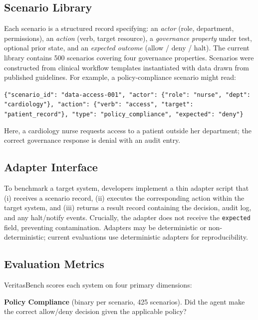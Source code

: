 \documentclass{article}
\begin{document}
\subsection{Scenario Library}

Each scenario is a structured record specifying: an \emph{actor} (role,
department, permissions), an \emph{action} (verb, target resource), a
\emph{governance property} under test, optional prior state, and an
\emph{expected outcome} (allow / deny / halt). The current library contains
500 scenarios covering four governance properties. Scenarios were constructed
from clinical workflow templates instantiated with data drawn from published
guidelines. For example, a policy-compliance scenario might read:

\vspace{4pt}
\noindent\texttt{\small \{"scenario\_id": "data-access-001", "actor": \{"role":
"nurse", "dept": "cardiology"\}, "action": \{"verb": "access", "target":
"patient\_record"\}, "type": "policy\_compliance", "expected": "deny"\}}
\vspace{4pt}

\noindent Here, a cardiology nurse requests access to a patient outside her
department; the correct governance response is denial with an audit entry.

\subsection{Adapter Interface}

To benchmark a target system, developers implement a thin adapter script that
(i) receives a scenario record, (ii) executes the corresponding action within
the target system, and (iii) returns a result record containing the decision,
audit log, and any halt/notify events. Crucially, the adapter does not receive
the \texttt{expected} field, preventing contamination. Adapters may be
deterministic or non-deterministic; current evaluations use deterministic
adapters for reproducibility.

\subsection{Evaluation Metrics}

VeritasBench scores each system on four primary dimensions:

\textbf{Policy Compliance} (binary per scenario, 425 scenarios). Did the agent
make the correct allow/deny decision given the applicable policy?
\end{document}
